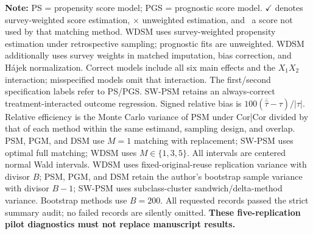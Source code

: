 \begin{table}
\begin{tabular}{@{} >{\centering\arraybackslash}p{1.3cm} l c c *{4}{c} *{4}{c} *{4}{c} @{}}
\bottomrule
\end{tabular}
\vspace{0.5em}
\begin{minipage}{\textwidth}
\footnotesize
\textbf{Note:} PS = propensity score model; PGS = prognostic score model. $\checkmark$ denotes survey-weighted score estimation, $\times$ unweighted estimation, and \textendash\, a score not used by that matching method. WDSM uses survey-weighted propensity estimation under retrospective sampling; prognostic fits are unweighted. WDSM additionally uses survey weights in matched imputation, bias correction, and H\'ajek normalization. Correct models include all six main effects and the $X_1X_2$ interaction; misspecified models omit that interaction. The first/second specification labels refer to PS/PGS. SW-PSM retains an always-correct treatment-interacted outcome regression. Signed relative bias is $100(\overline{\widehat\tau}-\tau)/|\tau|$. Relative efficiency is the Monte Carlo variance of PSM under Cor|Cor divided by that of each method within the same estimand, sampling design, and overlap. PSM, PGM, and DSM use $M=1$ matching with replacement; SW-PSM uses optimal full matching; WDSM uses $M\in\{1,3,5\}$. All intervals are centered normal Wald intervals. WDSM uses fixed-original-reuse replication variance with divisor $B$; PSM, PGM, and DSM retain the author's bootstrap sample variance with divisor $B-1$; SW-PSM uses subclass-cluster sandwich/delta-method variance. Bootstrap methods use $B=200$. All requested records passed the strict summary audit; no failed records are silently omitted. \textbf{These five-replication pilot diagnostics must not replace manuscript results.}
\end{minipage}
\end{table}



